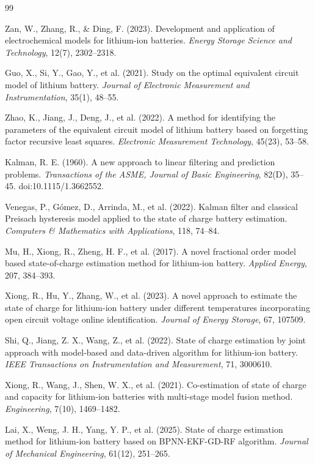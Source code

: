 \begin{thebibliography}{99}
\fontsize{8pt}{9.6pt}\selectfont

Zan, W., Zhang, R., \& Ding, F. (2023). Development and application of electrochemical models for lithium-ion batteries. \textit{Energy Storage Science and Technology}, 12(7), 2302–2318.

Guo, X., Si, Y., Gao, Y., et al. (2021). Study on the optimal equivalent circuit model of lithium battery. \textit{Journal of Electronic Measurement and Instrumentation}, 35(1), 48–55.

Zhao, K., Jiang, J., Deng, J., et al. (2022). A method for identifying the parameters of the equivalent circuit model of lithium battery based on forgetting factor recursive least squares. \textit{Electronic Measurement Technology}, 45(23), 53–58.

Kalman, R. E. (1960). A new approach to linear filtering and prediction problems. \textit{Transactions of the ASME, Journal of Basic Engineering}, 82(D), 35–45. doi:10.1115/1.3662552.

Venegas, P., Gómez, D., Arrinda, M., et al. (2022). Kalman filter and classical Preisach hysteresis model applied to the state of charge battery estimation. \textit{Computers \& Mathematics with Applications}, 118, 74–84.

Mu, H., Xiong, R., Zheng, H. F., et al. (2017). A novel fractional order model based state-of-charge estimation method for lithium-ion battery. \textit{Applied Energy}, 207, 384–393.

Xiong, R., Hu, Y., Zhang, W., et al. (2023). A novel approach to estimate the state of charge for lithium-ion battery under different temperatures incorporating open circuit voltage online identification. \textit{Journal of Energy Storage}, 67, 107509.

Shi, Q., Jiang, Z. X., Wang, Z., et al. (2022). State of charge estimation by joint approach with model-based and data-driven algorithm for lithium-ion battery. \textit{IEEE Transactions on Instrumentation and Measurement}, 71, 3000610.

Xiong, R., Wang, J., Shen, W. X., et al. (2021). Co-estimation of state of charge and capacity for lithium-ion batteries with multi-stage model fusion method. \textit{Engineering}, 7(10), 1469–1482.

Lai, X., Weng, J. H., Yang, Y. P., et al. (2025). State of charge estimation method for lithium-ion battery based on BPNN-EKF-GD-RF algorithm. \textit{Journal of Mechanical Engineering}, 61(12), 251–265.


\end{thebibliography}
